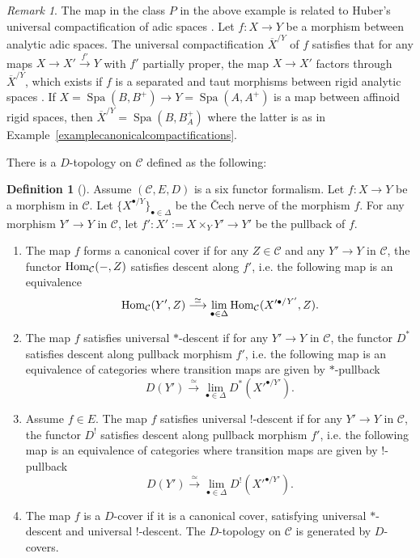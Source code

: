 \documentclass[a4paper,10pt]{amsart}
\theoremstyle{remark}
\newtheorem{remark}[theorem]{Remark}
\theoremstyle{definition}
\newtheorem{definition}[theorem]{Definition}
\theoremstyle{plain}
\numberwithin{equation}{section}
\newcommand{\calC}{{\mathcal C}}
\newcommand{\ovX}{{\overline X}}
\newcommand{\Hom}{{\rm Hom}}
\DeclareMathOperator{\Spa}{Spa}
\begin{document}
\begin{remark}\label{remarkuniversalcompletion}
	The map in the class $P$ in the above example is related to Huber's universal compactification of adic spaces \cite[Def.~5.1.1]{huber1996etale}. Let $f:X\rightarrow Y$ be a morphism between analytic adic spaces. The universal compactification $\ovX^{/Y}$ of $f$ satisfies that for any maps $X\to X'\xrightarrow{f'} Y$ with $f'$ partially proper, the map $X\to X'$ factors through $\ovX^{/Y}$, which exists if $f$ is a separated and taut morphisms between rigid analytic spaces \cite[Thm.~5.1.5]{huber1996etale}. If $X=\Spa(B,B^+)\rightarrow Y=\Spa(A,A^+)$ is a map between affinoid rigid spaces, then $\ovX^{/Y}=\Spa(B,B^+_A)$ where the latter is as in Example~\ref{examplecanonicalcompactifications}.
\end{remark}	

There is a $D$-topology on $\calC$ defined as the following: 
\begin{definition}[{\cite[Def.~5.13]{scholze2025six}}] \label{defDtopo}
Assume $(\calC,E,D)$ is a six functor formalism. Let $f: X\to Y$ be a morphism in $\calC$. Let $\{X^{\bullet/ Y}\}_{\bullet\in \Delta}$ be the \v Cech nerve of the morphism $f$. For any morphism $Y'\to Y$ in $\calC$, let $f': X':=X\times_Y Y'\to Y'$ be the pullback of $f$.  
	\begin{enumerate}
		\item The map $f$ forms a canonical cover if for any $Z\in \calC$ and any $Y'\to Y$ in $\calC$, the functor $\Hom_{\calC}(-,Z)$ satisfies descent along $f'$, i.e. the following map is an equivalence
		$$\Hom_{\calC}(Y',Z)\stackrel{\simeq}\longrightarrow \lim_{\bullet\in\Delta} \Hom_{\calC}(X'^{\bullet/ Y'},Z).$$
		\item The map $f$ satisfies universal $*$-descent if for any $Y'\to Y$ in $\calC$, the functor $D^*$ satisfies descent along pullback morphism $f'$, i.e. the following map is an equivalence of categories where transition maps are given by $*$-pullback
		$$D(Y')\stackrel{\simeq}\longrightarrow \lim_{\bullet\in\Delta} D^*(X'^{\bullet/Y'}).$$
		\item Assume $f\in E$. The map $f$ satisfies universal $!$-descent if for any $Y'\to Y$ in $\calC$, the functor $D^!$ satisfies descent along pullback morphism $f'$, i.e. the following map is an equivalence of categories where transition maps are given by $!$-pullback
		$$D(Y')\stackrel{\simeq}\longrightarrow \lim_{\bullet\in\Delta} D^!(X'^{\bullet/Y'}).$$
		\item The map $f$ is a $D$-cover if it is a canonical cover, satisfying universal $*$-descent and universal $!$-descent. The $D$-topology on $\calC$ is generated by $D$-covers.
	\end{enumerate}
\end{definition}
\end{document}
